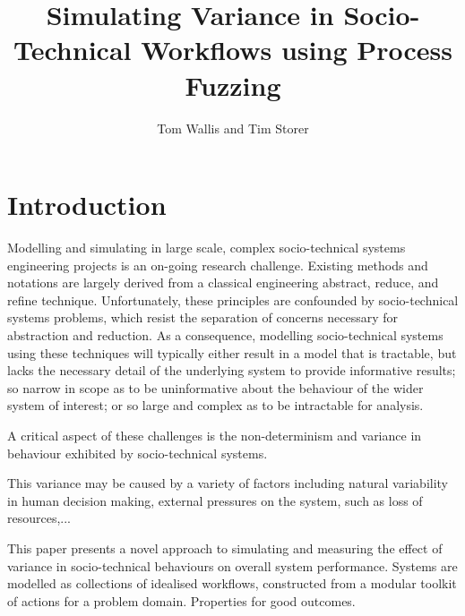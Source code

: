 \documentclass[11pt]{article}
\title{Simulating Variance in Socio-Technical Workflows using Process Fuzzing}
\author{Tom Wallis and Tim Storer}
\begin{document}

\maketitle


\begin{abstract}

\end{abstract}


\section{Introduction}


Modelling and simulating in large scale, complex socio-technical systems
engineering projects is an on-going research challenge.  Existing methods and
notations are largely derived from a classical engineering abstract, reduce, and
refine technique.  Unfortunately, these principles are confounded by
socio-technical systems problems, which resist the separation of concerns
necessary for abstraction and reduction.  As a consequence, modelling
socio-technical systems using these techniques will typically either result in a
model that is tractable, but lacks the necessary detail of the underlying system
to provide informative results; so narrow in scope as to be uninformative about
the behaviour of the wider system of interest; or so large and complex as to be
intractable for analysis.

A critical aspect of these challenges is the non-determinism and variance in
behaviour exhibited by socio-technical systems.

This variance may be caused by a variety of factors including natural
variability in human decision making, external pressures on the system, such as
loss of resources,...

This paper presents a novel approach to simulating and measuring the effect of
variance in socio-technical behaviours on overall system performance.  Systems
are modelled as collections of idealised workflows, constructed from a modular
toolkit of actions for a problem domain.  Properties for good outcomes.
\end{document}
